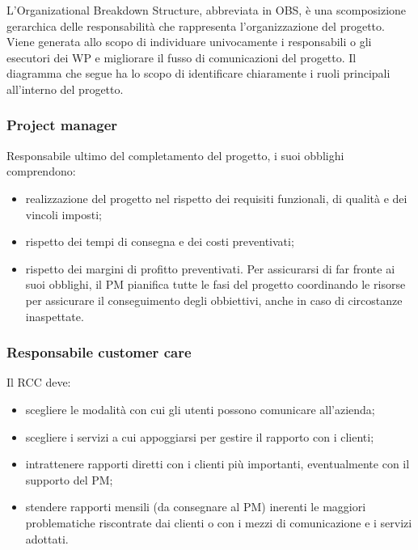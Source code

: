 L\textquoteright{}Organizational Breakdown Structure, abbreviata in OBS, \`{e} una scomposizione gerarchica delle responsabilit\`{a} che rappresenta l\textquoteright{}organizzazione del progetto. Viene generata allo scopo di individuare univocamente i responsabili o gli esecutori dei WP e migliorare il fusso di comunicazioni del progetto. Il diagramma che segue ha lo scopo di identificare chiaramente i ruoli principali all\textquoteright{}interno del progetto.

\subsubsection{Project manager}
Responsabile ultimo del completamento del progetto, i suoi obblighi comprendono:
\begin{itemize}
\item realizzazione del progetto nel rispetto dei requisiti funzionali, di qualit\`{a} e dei
vincoli imposti;
\item rispetto dei tempi di consegna e dei costi preventivati;
\item rispetto dei margini di profitto preventivati.
Per assicurarsi di far fronte ai suoi obblighi, il PM pianifica tutte le fasi del progetto
coordinando le risorse per assicurare il conseguimento degli obbiettivi, anche in caso di
circostanze inaspettate.
\end{itemize}

\subsubsection{Responsabile customer care}
Il RCC deve:
\begin{itemize}
\item scegliere le modalit\`{a} con cui gli utenti possono comunicare all\textquoteright{}azienda;
\item scegliere i servizi a cui appoggiarsi per gestire il rapporto con i clienti;
\item intrattenere rapporti diretti con i clienti pi\`{u} importanti, eventualmente con il
supporto del PM;
\item stendere rapporti mensili (da consegnare al PM) inerenti le maggiori problematiche
riscontrate dai clienti o con i mezzi di comunicazione e i servizi adottati.
\end{itemize}

